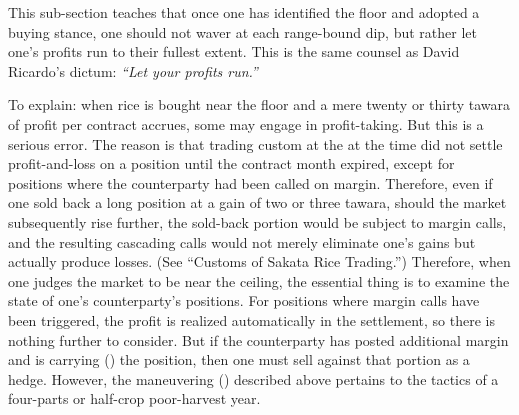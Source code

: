 \commentary
This sub-section teaches that once one has identified the floor and
adopted a buying stance, one should not waver at each range-bound dip,
but rather let one's profits run to their fullest extent. This is the
same counsel as David Ricardo's dictum: \textit{``Let your profits
run.''}

To explain: when rice is bought near the floor and a mere twenty or
thirty tawara of profit per contract accrues, some may engage in
profit-taking. But this is a serious error. The reason is that trading
custom at the  at the time did not
settle profit-and-loss on a position until the contract month expired,
except for positions where the counterparty had been called on margin.
Therefore, even if one sold back a long position at a gain of two or
three tawara, should the market subsequently rise further, the sold-back
portion would be subject to margin calls, and the resulting cascading
calls would not merely eliminate one's gains but actually produce losses.
(See ``Customs of Sakata Rice Trading.'') Therefore,
when one judges the market to be near the ceiling, the essential thing is
to examine the state of one's counterparty's positions. For positions
where margin calls have been triggered, the profit is realized
automatically in the settlement, so there is nothing further to consider.
But if the counterparty has posted additional margin and is carrying
() the position, then one must sell against that
portion as a hedge. However, the maneuvering ()
described above pertains to the tactics of a four-parts or half-crop
poor-harvest year.


